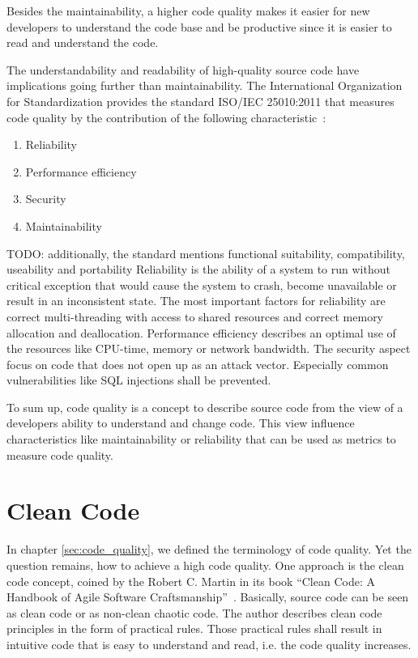 Besides the maintainability, a higher code quality makes it easier for new developers to understand the code base and be productive since it is easier to read and understand the code.

The understandability and readability of high-quality source code have implications going further than maintainability. The International Organization for Standardization provides the standard ISO/IEC 25010:2011 that measures code quality by the contribution of the following characteristic~\cite{iso_central_secretary_isoiec_2011}:
\begin{enumerate}
    \item Reliability
    \item Performance efficiency
    \item Security
    \item Maintainability
\end{enumerate}
TODO: additionally, the standard mentions functional suitability, compatibility, useability and portability
Reliability is the ability of a system to run without critical exception that would cause the system to crash, become unavailable or result in an inconsistent state. The most important factors for reliability are correct multi-threading with access to shared resources and correct memory allocation and deallocation. Performance efficiency describes an optimal use of the resources like CPU-time, memory or network bandwidth. The security aspect focus on code that does not open up as an attack vector. Especially common vulnerabilities like SQL injections shall be prevented.

To sum up, code quality is a concept to describe source code from the view of a developers ability to understand and change code. This view influence characteristics like maintainability or reliability that can be used as metrics to measure code quality. 

\section{Clean Code}\label{sec:clean_code}
In chapter \ref{sec:code_quality}, we defined the terminology of code quality. Yet the question remains, how to achieve a high code quality. One approach is the clean code concept, coined by the Robert C. Martin in its book \enquote{Clean Code: A Handbook of Agile Software Craftsmanship}~\cite{martin_clean_2009}. Basically, source code can be seen as clean code or as non-clean chaotic code. The author describes clean code principles in the form of practical rules. Those practical rules shall result in intuitive code that is easy to understand and read, i.e. the code quality increases.

